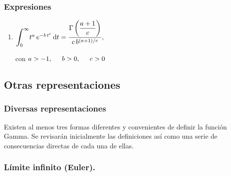 \documentclass[12pt]{beamer}
\begin{document}
\begin{frame}
\frametitle{Expresiones}
{%
\begin{enumerate}[<+->]
  \conti
  \item $\scaleint{6ex}_{\bs 0}^{\infty} t^{a} \, e^{-b \, t^{c}} \dd{t} = \dfrac{\Gamma \left(\dfrac{a + 1}{c} \right)}{c \, b^{(a+1)/c}},$

  \vspace{0.5cm}
  con  $a > -1, \hspace{0.5cm} b > 0, \hspace{0.5cm} c > 0$
\end{enumerate}
}
\end{frame}

\subsection*{Otras representaciones} \label{seccion:otras_respresentaciones}

\begin{frame}
\frametitle{Diversas representaciones}
Existen al menos tres formas diferentes y convenientes de definir la función Gamma. Se revisarán inicialmente las definiciones así como una serie de consecuencias directas de cada una de ellas.
\end{frame}

\subsubsection{Límite infinito (Euler).}
\end{document}
